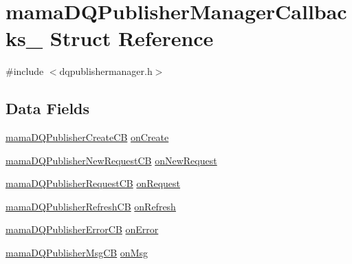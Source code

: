 \hypertarget{structmamaDQPublisherManagerCallbacks__}{
\section{mamaDQPublisherManagerCallbacks\_\- Struct Reference}
\label{structmamaDQPublisherManagerCallbacks__}
}


{\ttfamily \#include $<$dqpublishermanager.h$>$}\subsection*{Data Fields}
\begin{DoxyCompactItemize}
\item 
\hyperlink{dqpublishermanager_8h_af8a61db47d530b9e6dc14d4a901649ff}{mamaDQPublisherCreateCB} \hyperlink{structmamaDQPublisherManagerCallbacks___a21b67535327595ed4847c06ed466f63a}{onCreate}
\item 
\hyperlink{dqpublishermanager_8h_ad313521797334d1c99af7dcd6b79f73a}{mamaDQPublisherNewRequestCB} \hyperlink{structmamaDQPublisherManagerCallbacks___a76bd80a74340306ae414695b69f103f3}{onNewRequest}
\item 
\hyperlink{dqpublishermanager_8h_a379202ed8017b492a316cc04947d76ad}{mamaDQPublisherRequestCB} \hyperlink{structmamaDQPublisherManagerCallbacks___aca7d03d1c7fdee52eb97ff814e8b3c51}{onRequest}
\item 
\hyperlink{dqpublishermanager_8h_a7fd478eb1bf2e7d73718f8b861a8cd40}{mamaDQPublisherRefreshCB} \hyperlink{structmamaDQPublisherManagerCallbacks___a3d855a31538bc8ae916a15d7ccfdafad}{onRefresh}
\item 
\hyperlink{dqpublishermanager_8h_a0bccbe6f86fa6f4adb774f7643e93d19}{mamaDQPublisherErrorCB} \hyperlink{structmamaDQPublisherManagerCallbacks___a4380fac4193d8077d9af46135865315e}{onError}
\item 
\hyperlink{dqpublishermanager_8h_aa77239d76fd081eba31c0def82a585ba}{mamaDQPublisherMsgCB} \hyperlink{structmamaDQPublisherManagerCallbacks___ac30910f617df8504d4173a587d017986}{onMsg}
\end{DoxyCompactItemize}


